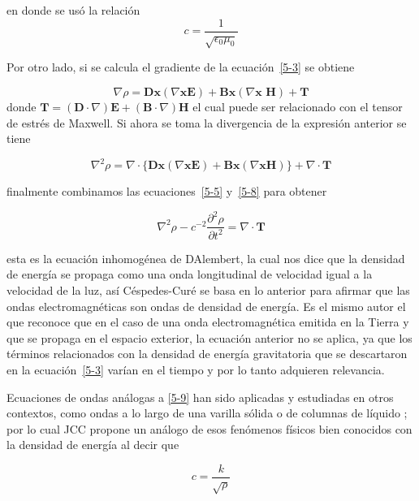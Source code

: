 en donde se usó la relación
\begin{equation} \label{c/permitividad}
    c=\frac{1}{\sqrt{\epsilon_0 \mu_0}}
\end{equation}


Por otro lado, si se calcula el gradiente de la ecuación~\ref{5-3} se obtiene

\begin{equation} \label{5-6}
    \nabla \rho = \textbf{Dx}(\nabla \textbf{xE}) + \textbf{Bx}(\nabla \textbf{x H}) + \textbf{T}
\end{equation}
 donde $\textbf{T}=(\textbf{D}\cdot\nabla)\textbf{E}+(\textbf{B} \cdot \nabla)\textbf{H}$
 el cual puede ser relacionado con el tensor de estrés de Maxwell. Si ahora se toma la divergencia de la expresión anterior se tiene 

 \begin{equation} \label{5-8}
     \nabla ^2 \rho = \nabla \cdot \{\textbf{Dx}(\nabla\textbf{xE})+\textbf{Bx}(\nabla \textbf{xH})\}+\nabla \cdot \textbf{T}
 \end{equation}

finalmente combinamos las ecuaciones~\ref{5-5} y~\ref{5-8} para obtener

\begin{equation} \label{5-9}
     \nabla ^2 \rho -c^{-2} \frac{\partial^2 \rho}{\partial t^2} = \nabla \cdot \textbf{T}
\end{equation}

esta es la ecuación inhomogénea de D\textquotesingle Alembert, la cual nos dice que la densidad de energía se propaga como una onda longitudinal de velocidad igual a la velocidad de la luz, así Céspedes-Curé se basa en lo anterior para afirmar que las ondas electromagnéticas son ondas de densidad de energía. Es el mismo autor el que reconoce que en el caso de una onda electromagnética emitida en la Tierra y que se propaga en el espacio exterior, la ecuación anterior no se aplica, ya que los términos relacionados con la densidad de energía gravitatoria que se descartaron en la ecuación~\ref{5-3} varían en el tiempo y por lo tanto adquieren relevancia.

Ecuaciones de ondas análogas a \eqref{5-9} han sido aplicadas y estudiadas en otros contextos, como ondas a lo largo de una varilla sólida o de columnas de líquido \cite{vibracionesyondas}; por lo cual JCC propone un análogo de esos fenómenos físicos bien conocidos con la densidad de energía al decir que

\begin{equation} \label{HCC}
    c = \frac{k}{\sqrt{\rho}}
\end{equation}

